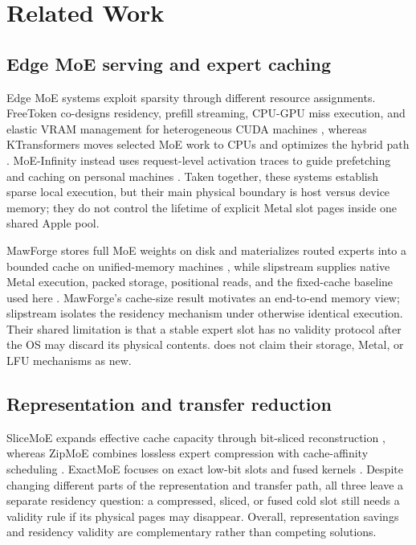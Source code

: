 \section{Related Work}
\label{sec:related}

\subsection{Edge MoE serving and expert caching}

Edge MoE systems exploit sparsity through different resource assignments.
FreeToken co-designs residency, prefill streaming, CPU-GPU miss execution, and
elastic VRAM management for heterogeneous CUDA machines
\cite{yang2026freetoken}, whereas KTransformers moves selected MoE work to CPUs
and optimizes the hybrid path \cite{chen2025ktransformers}. MoE-Infinity instead
uses request-level activation traces to guide prefetching and caching on
personal machines \cite{xue2024moeinfinity}. Taken together, these systems
establish sparse local execution, but their main physical boundary is host
versus device memory; they do not control the lifetime of explicit Metal slot
pages inside one shared Apple pool.

MawForge stores full MoE weights on disk and materializes routed experts into a
bounded cache on unified-memory machines \cite{opie2026mawforge}, while
slipstream supplies native Metal execution, packed storage, positional reads,
and the fixed-cache baseline used here \cite{patel2026slipstream}. MawForge's
cache-size result motivates an end-to-end memory view; slipstream isolates the
residency mechanism under otherwise identical execution. Their shared
limitation is that a stable expert slot has no validity protocol after the OS
may discard its physical contents. \system does not claim their storage,
Metal, or LFU mechanisms as new.

\subsection{Representation and transfer reduction}

SliceMoE expands effective cache capacity through bit-sliced reconstruction
\cite{choi2026slicemoe}, whereas ZipMoE combines lossless expert compression
with cache-affinity scheduling \cite{yang2026zipmoe}. ExactMoE focuses on exact
low-bit slots and fused kernels \cite{saab2026exactmoe}. Despite changing
different parts of the representation and transfer path, all three leave a
separate residency question: a compressed, sliced, or fused cold slot still
needs a validity rule if its physical pages may disappear.
Overall, representation savings and residency validity are complementary rather
than competing solutions.

